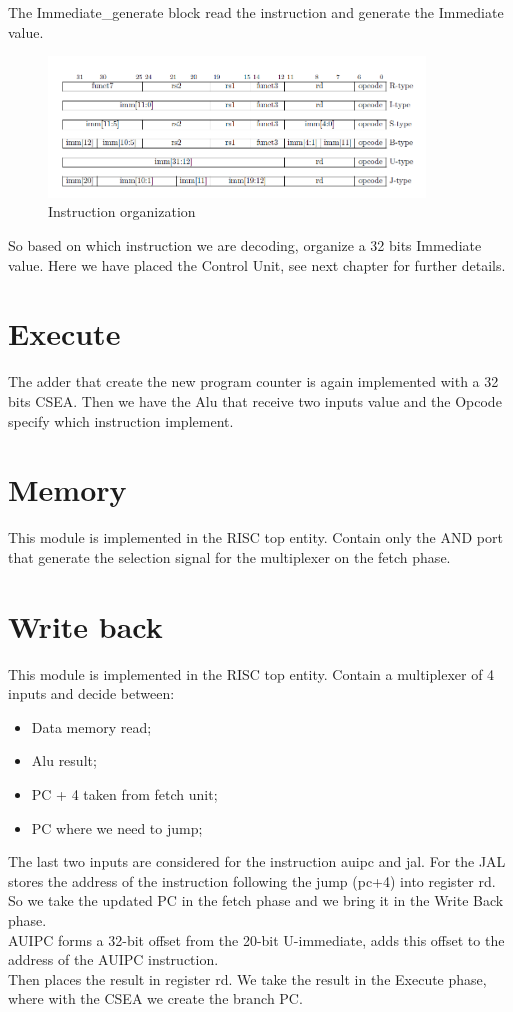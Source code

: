 The Immediate\_generate block read the instruction and generate the Immediate value.
\begin{figure}[h!]
	\centering
	\includegraphics[width=10cm]{./images/immediate_gen}
	\caption{Instruction organization}
	\label{fig2.4}
\end{figure} 
So based on which instruction we are decoding, organize a 32 bits Immediate value.
Here we have placed the Control Unit, see next chapter for further details.
\section{Execute}
The adder that create the new program counter is again implemented with a 32 bits CSEA.
Then we have the Alu that receive two inputs value and the Opcode specify which instruction implement.
\section{Memory}
This module is implemented in the RISC top entity. Contain only the AND port that generate the selection signal for the multiplexer on the fetch phase.
\section{Write back}
This module is implemented in the RISC top entity. Contain a multiplexer of 4 inputs and decide between:
\begin{itemize}
	\item Data memory read;
	\item Alu result;
	\item PC + 4 taken from fetch unit;
	\item PC where we need to jump;
\end{itemize}
The last two inputs are considered for the instruction auipc and jal.
For the JAL stores the address of the instruction following the jump (pc+4) into register rd.\\
So we take the updated PC in the fetch phase and we bring it in the Write Back phase.\\
AUIPC forms a 32-bit offset from the 20-bit U-immediate, adds this offset to the address of the AUIPC instruction.\\
Then places the result in register rd. 
We take the result in the Execute phase, where with the CSEA we create the branch PC.